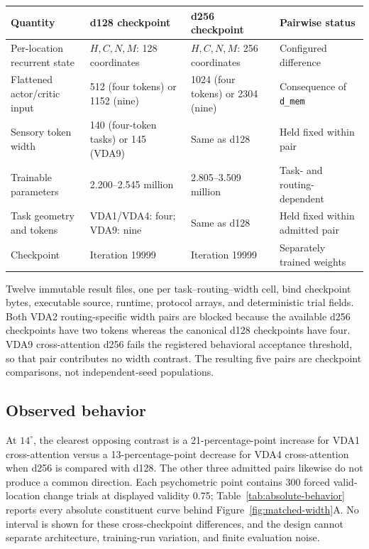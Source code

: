 \documentclass[11pt,a4paper]{article}
\begin{document}
\begingroup\small
{}\label{tab:width-comparison}
\begin{tabularx}{\textwidth}{@{}p{4.0cm}Y Y Y@{}}
\toprule
Quantity & d128 checkpoint & d256 checkpoint & Pairwise status\\
\midrule
Per-location recurrent state & $H,C,N,M$: 128 coordinates & $H,C,N,M$: 256 coordinates & Configured difference\\
Flattened actor/critic input & 512 (four tokens) or 1152 (nine) & 1024 (four tokens) or 2304 (nine) & Consequence of \texttt{d\_mem}\\
Sensory token width & 140 (four-token tasks) or 145 (VDA9) & Same as d128 & Held fixed within pair\\
Trainable parameters & 2.200--2.545 million & 2.805--3.509 million & Task- and routing-dependent\\
Task geometry and tokens & VDA1/VDA4: four; VDA9: nine & Same as d128 & Held fixed within admitted pair\\
Checkpoint & Iteration 19999 & Iteration 19999 & Separately trained weights\\
\bottomrule
\end{tabularx}
\endgroup

Twelve immutable result files, one per task--routing--width cell, bind checkpoint bytes, executable source, runtime, protocol arrays, and deterministic trial fields. Both VDA2 routing-specific width pairs are blocked because the available d256 checkpoints have two tokens whereas the canonical d128 checkpoints have four. VDA9 cross-attention d256 fails the registered behavioral acceptance threshold, so that pair contributes no width contrast. The resulting five pairs are checkpoint comparisons, not independent-seed populations.

\subsection{Observed behavior}
At $14^\circ$, the clearest opposing contrast is a 21-percentage-point increase for VDA1 cross-attention versus a 13-percentage-point decrease for VDA4 cross-attention when d256 is compared with d128. The other three admitted pairs likewise do not produce a common direction. Each psychometric point contains 300 forced valid-location change trials at displayed validity 0.75; Table~\ref{tab:absolute-behavior} reports every absolute constituent curve behind Figure~\ref{fig:matched-width}A. No interval is shown for these cross-checkpoint differences, and the design cannot separate architecture, training-run variation, and finite evaluation noise.
\end{document}
